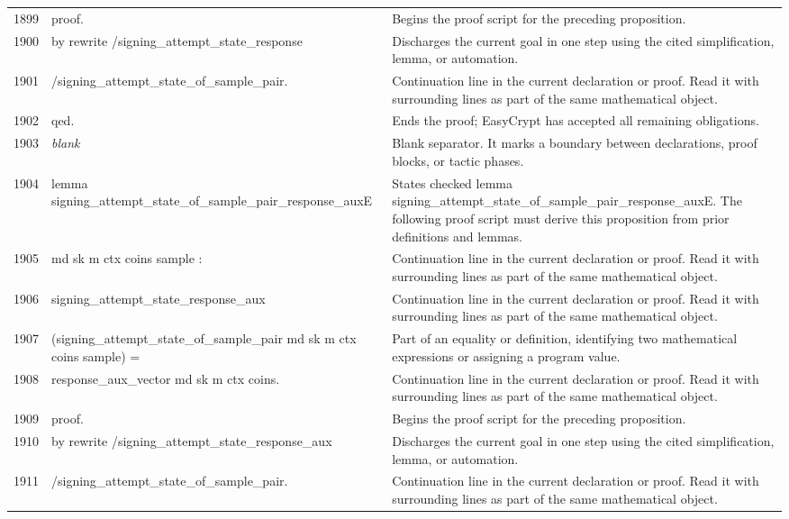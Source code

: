 \documentclass[10pt]{article}
\begin{document}
\begin{longtable}{r L{0.53\textwidth} L{0.37\textwidth}}
1899 & {\ttfamily\scriptsize proof.} & Begins the proof script for the preceding proposition. \\
1900 & {\ttfamily\scriptsize by rewrite /signing\_attempt\_state\_response} & Discharges the current goal in one step using the cited simplification, lemma, or automation. \\
1901 & {\ttfamily\scriptsize            /signing\_attempt\_state\_of\_sample\_pair.} & Continuation line in the current declaration or proof.  Read it with surrounding lines as part of the same mathematical object. \\
1902 & {\ttfamily\scriptsize qed.} & Ends the proof; EasyCrypt has accepted all remaining obligations. \\
1903 & {\ttfamily\scriptsize \emph{blank}} & Blank separator.  It marks a boundary between declarations, proof blocks, or tactic phases. \\
1904 & {\ttfamily\scriptsize lemma signing\_attempt\_state\_of\_sample\_pair\_response\_auxE} & States checked lemma signing\_attempt\_state\_of\_sample\_pair\_response\_auxE.  The following proof script must derive this proposition from prior definitions and lemmas. \\
1905 & {\ttfamily\scriptsize    md sk m ctx coins sample :} & Continuation line in the current declaration or proof.  Read it with surrounding lines as part of the same mathematical object. \\
1906 & {\ttfamily\scriptsize   signing\_attempt\_state\_response\_aux} & Continuation line in the current declaration or proof.  Read it with surrounding lines as part of the same mathematical object. \\
1907 & {\ttfamily\scriptsize     (signing\_attempt\_state\_of\_sample\_pair md sk m ctx coins sample) =} & Part of an equality or definition, identifying two mathematical expressions or assigning a program value. \\
1908 & {\ttfamily\scriptsize   response\_aux\_vector md sk m ctx coins.} & Continuation line in the current declaration or proof.  Read it with surrounding lines as part of the same mathematical object. \\
1909 & {\ttfamily\scriptsize proof.} & Begins the proof script for the preceding proposition. \\
1910 & {\ttfamily\scriptsize by rewrite /signing\_attempt\_state\_response\_aux} & Discharges the current goal in one step using the cited simplification, lemma, or automation. \\
1911 & {\ttfamily\scriptsize            /signing\_attempt\_state\_of\_sample\_pair.} & Continuation line in the current declaration or proof.  Read it with surrounding lines as part of the same mathematical object. \\

\end{longtable}
\end{document}

